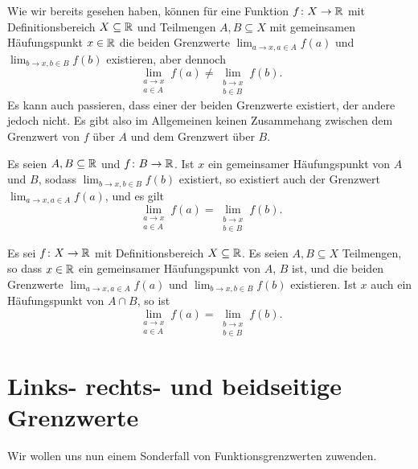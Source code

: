 \documentclass[a4paper,10pt]{article}
\begin{document}
Wie wir bereits gesehen haben, können für eine Funktion $f \colon X \to \mathbb{R}$ mit Definitionsbereich $X \subseteq \mathbb{R}$ und Teilmengen $A, B \subseteq X$ mit gemeinsamen Häufungspunkt $x \in \mathbb{R}$ die beiden Grenzwerte $\lim_{a \to x, a \in A} f(a)$ und $\lim_{b \to x, b \in B} f(b)$ existieren, aber dennoch
\[
 \lim_{\substack{a \to x \\ a \in A}} f(a)
 \neq
 \lim_{\substack{b \to x \\ b \in B}} f(b).
\]
Es kann auch passieren, dass einer der beiden Grenzwerte existiert, der andere jedoch nicht. Es gibt also im Allgemeinen keinen Zusammehang zwischen dem Grenzwert von $f$ über $A$ und dem Grenzwert über $B$.


\begin{lem}\label{lem: Grenzwerte auf Teilmengen}
 Es seien $A, B \subseteq \mathbb{R}$ und $f \colon B \to \mathbb{R}$. Ist $x$ ein gemeinsamer Häufungspunkt von $A$ und $B$, sodass $\lim_{b \to x, b \in B} f(b)$ existiert, so existiert auch der Grenzwert $\lim_{a \to x, a \in A} f(a)$, und es gilt
 \[
  \lim_{\substack{a \to x \\ a \in A}} f(a)
  = \lim_{\substack{b \to x \\ b \in B}} f(b).
 \]
\end{lem}


\begin{kor}
 Es sei $f \colon X \to \mathbb{R}$ mit Definitionsbereich $X \subseteq \mathbb{R}$. Es seien $A, B \subseteq X$ Teilmengen, so dass $x \in \mathbb{R}$ ein gemeinsamer Häufungspunkt von $A$, $B$ ist, und die beiden Grenzwerte $\lim_{a \to x, a \in A} f(a)$ und $\lim_{b \to x, b \in B} f(b)$ existieren. Ist $x$ auch ein Häufungspunkt von $A \cap B$, so ist
 \[
  \lim_{\substack{a \to x \\ a \in A}} f(a)
  = \lim_{\substack{b \to x \\ b \in B}} f(b).
 \]
\end{kor}





\section{Links- rechts- und beidseitige Grenzwerte}
Wir wollen uns nun einem Sonderfall von Funktionsgrenzwerten zuwenden.
\end{document}
